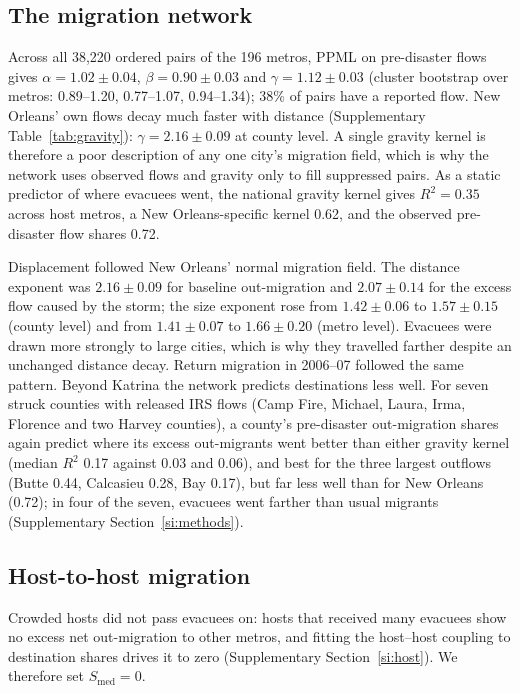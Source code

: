 \documentclass[11pt]{article}
\begin{document}
\subsection{The migration network}
Across all 38{,}220 ordered pairs of the 196 metros, PPML \citep{SantosSilva2006} on pre-disaster flows gives $\alpha=1.02\pm0.04$, $\beta=0.90\pm0.03$ and $\gamma=1.12\pm0.03$ (cluster bootstrap over metros: 0.89--1.20, 0.77--1.07, 0.94--1.34); 38\% of pairs have a reported flow. New Orleans' own flows decay much faster with distance (Supplementary Table~\ref{tab:gravity}): $\gamma=2.16\pm0.09$ at county level. A single gravity kernel is therefore a poor description of any one city's migration field, which is why the network uses observed flows and gravity only to fill suppressed pairs. As a static predictor of where evacuees went, the national gravity kernel gives $R^2=0.35$ across host metros, a New Orleans-specific kernel 0.62, and the observed pre-disaster flow shares 0.72.

Displacement followed New Orleans' normal migration field. The distance exponent was $2.16\pm0.09$ for baseline out-migration and $2.07\pm0.14$ for the excess flow caused by the storm; the size exponent rose from $1.42\pm0.06$ to $1.57\pm0.15$ (county level) and from $1.41\pm0.07$ to $1.66\pm0.20$ (metro level). Evacuees were drawn more strongly to large cities, which is why they travelled farther despite an unchanged distance decay. Return migration in 2006--07 followed the same pattern. Beyond Katrina the network predicts destinations less well. For seven struck counties with released IRS flows (Camp Fire, Michael, Laura, Irma, Florence and two Harvey counties), a county's pre-disaster out-migration shares again predict where its excess out-migrants went better than either gravity kernel (median $R^2$ 0.17 against 0.03 and 0.06), and best for the three largest outflows (Butte 0.44, Calcasieu 0.28, Bay 0.17), but far less well than for New Orleans (0.72); in four of the seven, evacuees went farther than usual migrants (Supplementary Section~\ref{si:methods}).

\subsection{Host-to-host migration}
Crowded hosts did not pass evacuees on: hosts that received many evacuees show no excess net out-migration to other metros, and fitting the host--host coupling to destination shares drives it to zero (Supplementary Section~\ref{si:host}). We therefore set $S_{\text{med}}=0$.
\end{document}
